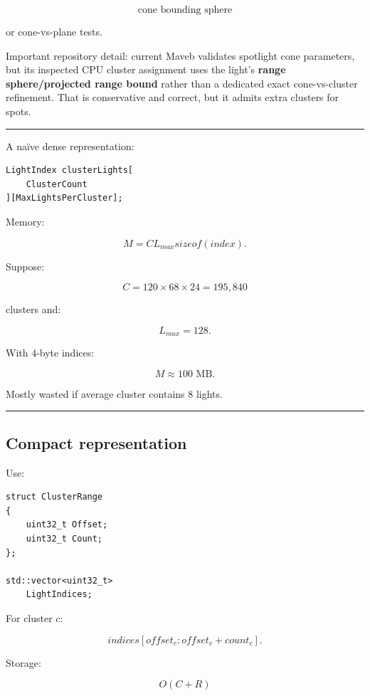 \[
\text{cone bounding sphere}
\]

or cone-vs-plane tests.

Important repository detail: current Maveb validates spotlight cone parameters, but its inspected CPU cluster assignment uses the light's \textbf{range sphere/projected range bound} rather than a dedicated exact cone-vs-cluster refinement. That is conservative and correct, but it admits extra clusters for spots.

\begin{center}\rule{0.5\linewidth}{0.5pt}\end{center}

A naïve dense representation:

\begin{verbatim}
LightIndex clusterLights[
    ClusterCount
][MaxLightsPerCluster];
\end{verbatim}

Memory:

\[
M=
C
L_{max}
sizeof(index).
\]

Suppose:

\[
C=120\times68\times24
=
195,840
\]

clusters and:

\[
L_{max}=128.
\]

With 4-byte indices:

\[
M\approx100\text{ MB}.
\]

Mostly wasted if average cluster contains 8 lights.

\begin{center}\rule{0.5\linewidth}{0.5pt}\end{center}

\subsection{Compact representation}\label{04-visual-computing-ii-ch040-compact-representation}

Use:

\begin{verbatim}
struct ClusterRange
{
    uint32_t Offset;
    uint32_t Count;
};

std::vector<uint32_t>
    LightIndices;
\end{verbatim}

For cluster \(c\):

\[
indices[
offset_c:
offset_c+count_c
].
\]

Storage:

\[
O(C+R)
\]

